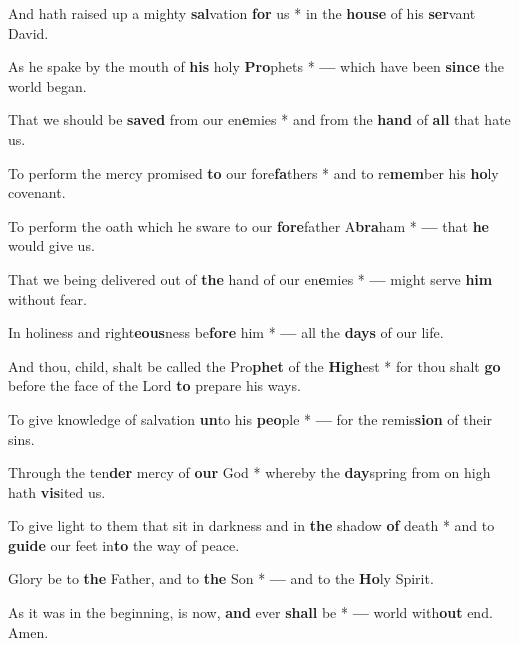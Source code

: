 \begin{multicols}{2}
	And hath raised up a mighty \textbf{sal}vation \textbf{for} us * in the \textbf{house} of his \textbf{ser}vant David.
	
	As he spake by the mouth of \textbf{his} holy \textbf{Pro}phets * \textbf{---} which have been \textbf{since} the world began.
	
	That we should be \textbf{saved} from our en\textbf{e}mies * and from the \textbf{hand} of \textbf{all} that hate us.
	
	To perform the mercy promised \textbf{to} our fore\textbf{fa}thers * and to re\textbf{mem}ber his \textbf{ho}ly covenant.
	
	To perform the oath which he sware to our \textbf{fore}father A\textbf{bra}ham * \textbf{---} that \textbf{he} would give us.
	
	That we being delivered out of \textbf{the} hand of our en\textbf{e}mies * \textbf{---} might serve \textbf{him} without fear.
	
	In holiness and right\textbf{eous}ness be\textbf{fore} him * \textbf{---} all the \textbf{days} of our life.
	
	And thou, child, shalt be called the Pro\textbf{phet} of the \textbf{High}est * for thou shalt \textbf{go} before the face of the Lord \textbf{to} prepare his ways.
	
	To give knowledge of salvation \textbf{un}to his \textbf{peo}ple * \textbf{---} for the remis\textbf{sion} of their sins.
	
	Through the ten\textbf{der} mercy of \textbf{our} God * whereby the \textbf{day}spring from on high hath \textbf{vis}ited us.
	
	To give light to them that sit in darkness and in \textbf{the} shadow \textbf{of} death * and to \textbf{guide} our feet in\textbf{to} the way of peace.
	
	Glory be to \textbf{the} Father, and to \textbf{the} Son * \textbf{---} and to the \textbf{Ho}ly Spirit.
	
	As it was in the beginning, is now, \textbf{and} ever \textbf{shall} be * \textbf{---} world with\textbf{out} end. Amen.
\end{multicols}